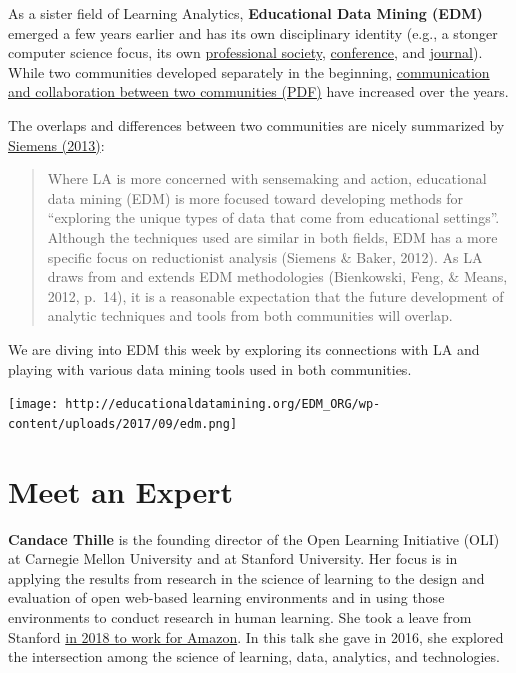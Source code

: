 \documentclass[
]{book}
\begin{document}
As a sister field of Learning Analytics, \textbf{Educational Data Mining (EDM)} emerged a few years earlier and has its own disciplinary identity (e.g., a stonger computer science focus, its own \href{http://educationaldatamining.org/about/}{professional society}, \href{http://educationaldatamining.org/conferences/}{conference}, and \href{https://jedm.educationaldatamining.org/index.php/JEDM}{journal}). While two communities developed separately in the beginning, \href{http://www.upenn.edu/learninganalytics/ryanbaker/LAKs\%20reformatting\%20v2.pdf}{communication and collaboration between two communities (PDF)} have increased over the years.

The overlaps and differences between two communities are nicely summarized by \href{http://journals.sagepub.com/doi/10.1177/0002764213498851}{Siemens (2013)}:

\begin{quote}
Where LA is more concerned with sensemaking and action, educational data mining (EDM) is more focused toward developing methods for ``exploring the unique types of data that come from educational settings''. Although the techniques used are similar in both fields, EDM has a more specific focus on reductionist analysis (Siemens \& Baker, 2012). As LA draws from and extends EDM methodologies (Bienkowski, Feng, \& Means, 2012, p.~14), it is a reasonable expectation that the future development of analytic techniques and tools from both communities will overlap.
\end{quote}

We are diving into EDM this week by exploring its connections with LA and playing with various data mining tools used in both communities.

\texttt{[image: http://educationaldatamining.org/EDM\_ORG/wp-content/uploads/2017/09/edm.png]}

\hypertarget{meet-an-expert}{%
\section{Meet an Expert}\label{meet-an-expert}}

\textbf{Candace Thille} is the founding director of the Open Learning Initiative (OLI) at Carnegie Mellon University and at Stanford University. Her focus is in applying the results from research in the science of learning to the design and evaluation of open web-based learning environments and in using those environments to conduct research in human learning. She took a leave from Stanford \href{https://www.insidehighered.com/digital-learning/article/2018/01/29/amazons-high-profile-hire-higher-education-candace-thille}{in 2018 to work for Amazon}. In this talk she gave in 2016, she explored the intersection among the science of learning, data, analytics, and technologies.
\end{document}
